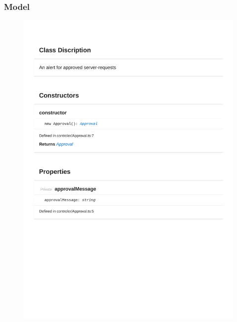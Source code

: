 \subsubsection{Model}
\begin{figure}[H]
\centerline{\includegraphics[width=1\textwidth]{FrontendDocsAsPDF/Model/Approval.pdf}}
\end{figure}


